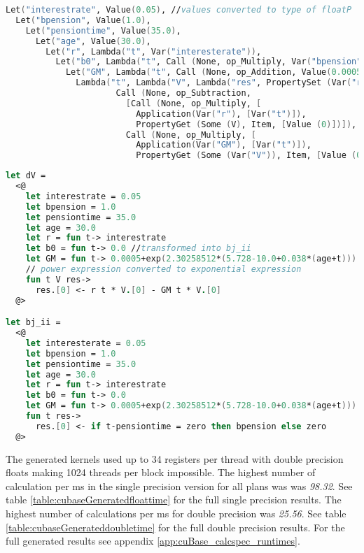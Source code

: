 \begin{lstlisting}[language=fsharp, caption=Quotation AST for dV method generated from CalcSpec AST, label=pe_quote]
Let("interestrate", Value(0.05), //values converted to type of floatP
  Let("bpension", Value(1.0), 
    Let("pensiontime", Value(35.0), 
      Let("age", Value(30.0), 
        Let("r", Lambda("t", Var("interesterate")), 
          Let("b0", Lambda("t", Call (None, op_Multiply, Var("bpension")::[Application(Var("delta"), Call (None, op_Subtraction, Var("t")::[Var("pensiontime")]))])), 
            Let("GM", Lambda("t", Call (None, op_Addition, Value(0.0005)::[...])), 
              Lambda("t", Lambda("V", Lambda("res", PropertySet (Var("res"), Item, [Value (0),
                      Call (None, op_Subtraction,
                        [Call (None, op_Multiply, [
                          Application(Var("r"), [Var("t")]),
                          PropertyGet (Some (V), Item, [Value (0)])]),
                        Call (None, op_Multiply, [
                          Application(Var("GM"), [Var("t")]),
                          PropertyGet (Some (Var("V")), Item, [Value (0)])])])]))))))))))))
\end{lstlisting}

\begin{lstlisting}[language=fsharp, caption=Formatted quotation AST for dV and bj\_ii methods, label=pe_quote_format]
let dV = 
  <@
    let interestrate = 0.05
    let bpension = 1.0
    let pensiontime = 35.0
    let age = 30.0
    let r = fun t-> interestrate
    let b0 = fun t-> 0.0 //transformed into bj_ii
    let GM = fun t-> 0.0005+exp(2.30258512*(5.728-10.0+0.038*(age+t))) 
    // power expression converted to exponential expression
    fun t V res->
      res.[0] <- r t * V.[0] - GM t * V.[0]
  @>

let bj_ii = 
  <@
    let interesterate = 0.05
    let bpension = 1.0
    let pensiontime = 35.0
    let age = 30.0
    let r = fun t-> interestrate
    let b0 = fun t-> 0.0
    let GM = fun t-> 0.0005+exp(2.30258512*(5.728-10.0+0.038*(age+t)))
    fun t res->
      res.[0] <- if t-pensiontime = zero then bpension else zero
  @>
\end{lstlisting}


The generated kernels used up to 34 registers per thread with double precision floats making 1024 threads per block impossible. 
The highest number of calculation per ms in the single precision version for all plans was was \emph{98.32}.
See table \ref{table:cubaseGeneratedfloattime} for the full single precision results. 
The highest number of calculations per ms for double precision was \emph{25.56}.
See table \ref{table:cubaseGenerateddoubletime} for the full double precision results. 
For the full generated results see appendix \ref{app:cuBase_calcspec_runtimes}.

